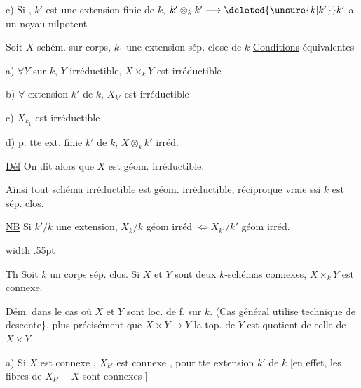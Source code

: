 c) Si , $k'$ est une extension finie de $k$, $k'\otimes_k k'\longrightarrow\deleted{\unsure{k|k'}}k'$ a un noyau nilpotent


Soit $X$ schém. sur corps, $k_1$ une extension sép. close de $k$ \uline{Conditions} équivalentes

a) $\forall Y$ sur $k$, $Y$ irréductible, $X\times_k Y$ est irréductible

b) $\forall$ extension $k'$ de $k$, $X_{k'}$ est irréductible

c) $X_{k_1}$ est irréductible

d) p. tte ext. finie  $k'$ de $k$, $X\otimes_k k'$ irréd.



\uline{Déf} On dit alors que $X$ est géom. irréductible.

Ainsi  tout schéma irréductible est géom. irréductible, réciproque vraie ssi $k$ est sép. clos.

\uline{NB} Si $k'/k$ une extension, $X_k/k$ géom irréd $\Longleftrightarrow X_{k'}/k'$ géom irréd. 

 

\noindent\vrule width .55pt\hspace{.5em}\begin{minipage}{.92\linewidth}
\uline{Th} Soit $k$ un corps sép. clos. Si $X$ et $Y$ sont deux $k$-schémas connexes, $X\times_k Y$ est connexe.

\end{minipage}\par
\uline{Dém.} dans le cas où $X$ et $Y$ sont loc. de  f. sur $k$. (Cas général utilise technique de descente\}, plus précisément que $X\times Y\longrightarrow Y$ la top. de $Y$ est quotient de celle de $X\times Y$.

a) Si $X$ est connexe , $X_{k'}$ est connexe , pour tte extension $k'$ de $k$ [en effet, les fibres de $X_{k'}-X$ sont connexes ]

